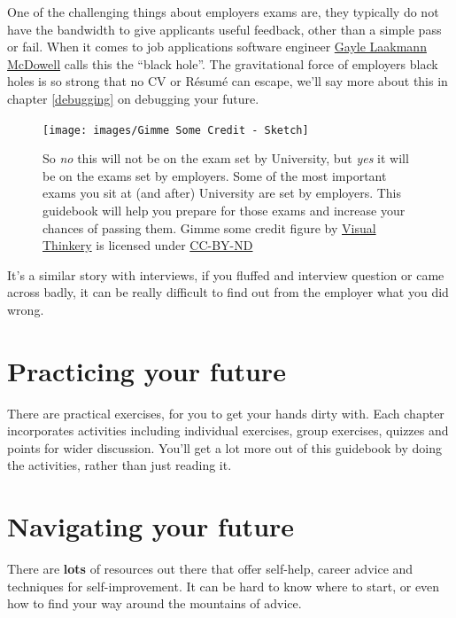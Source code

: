 \documentclass[
]{book}
\begin{document}
One of the challenging things about employers exams are, they typically do not have the bandwidth to give applicants useful feedback, other than a simple pass or fail. When it comes to job applications software engineer \href{https://en.wikipedia.org/wiki/Gayle_Laakmann_McDowell}{Gayle Laakmann McDowell} calls this the ``black hole''. The gravitational force of employers black holes is so strong that no CV or Résumé can escape, we'll say more about this in chapter \ref{debugging} on debugging your future.

\begin{figure}

{\centering \texttt{[image: images/Gimme Some Credit - Sketch]} 

}

\caption{So \emph{no} this will not be on the exam set by University, but \emph{yes} it will be on the exams set by employers. Some of the most important exams you sit at (and after) University are set by employers. This guidebook will help you prepare for those exams and increase your chances of passing them. Gimme some credit figure by \href{https://visualthinkery.com/}{Visual Thinkery} is licensed under \href{https://creativecommons.org/licenses/by-nd/4.0/}{CC-BY-ND}}\label{fig:exam-fig}
\end{figure}



It's a similar story with interviews, if you fluffed and interview question or came across badly, it can be really difficult to find out from the employer what you did wrong.

\hypertarget{activities}{%
\section{Practicing your future}\label{activities}}

There are practical exercises, for you to get your hands dirty with. Each chapter incorporates activities including individual exercises, group exercises, quizzes and points for wider discussion. You'll get a lot more out of this guidebook by doing the activities, rather than just reading it.

\hypertarget{relatedwork}{%
\section{Navigating your future}\label{relatedwork}}

There are \textbf{lots} of resources out there that offer self-help, career advice and techniques for self-improvement. It can be hard to know where to start, or even how to find your way around the mountains of advice.
\end{document}
